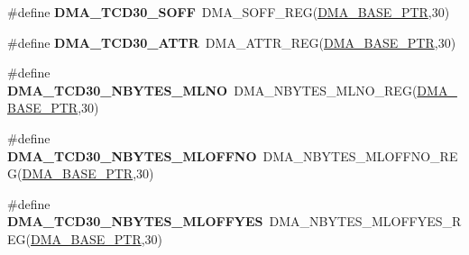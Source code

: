 \begin{DoxyCompactItemize}
\item 
\hypertarget{group___d_m_a___register___accessor___macros_ga91892f8ee9df2da70fd37dec9d07046d}{}\#define {\bfseries D\+M\+A\+\_\+\+T\+C\+D30\+\_\+\+S\+O\+F\+F}~D\+M\+A\+\_\+\+S\+O\+F\+F\+\_\+\+R\+E\+G(\hyperlink{group___d_m_a___peripheral_ga6997fbc1b1973e9f27170217a3bd6f22}{D\+M\+A\+\_\+\+B\+A\+S\+E\+\_\+\+P\+T\+R},30)\label{group___d_m_a___register___accessor___macros_ga91892f8ee9df2da70fd37dec9d07046d}

\item 
\hypertarget{group___d_m_a___register___accessor___macros_gabd8168bbcfdb00d4aa87d76fa96b08d7}{}\#define {\bfseries D\+M\+A\+\_\+\+T\+C\+D30\+\_\+\+A\+T\+T\+R}~D\+M\+A\+\_\+\+A\+T\+T\+R\+\_\+\+R\+E\+G(\hyperlink{group___d_m_a___peripheral_ga6997fbc1b1973e9f27170217a3bd6f22}{D\+M\+A\+\_\+\+B\+A\+S\+E\+\_\+\+P\+T\+R},30)\label{group___d_m_a___register___accessor___macros_gabd8168bbcfdb00d4aa87d76fa96b08d7}

\item 
\hypertarget{group___d_m_a___register___accessor___macros_ga3ecdb3c2d6e308785cd7825550565c0d}{}\#define {\bfseries D\+M\+A\+\_\+\+T\+C\+D30\+\_\+\+N\+B\+Y\+T\+E\+S\+\_\+\+M\+L\+N\+O}~D\+M\+A\+\_\+\+N\+B\+Y\+T\+E\+S\+\_\+\+M\+L\+N\+O\+\_\+\+R\+E\+G(\hyperlink{group___d_m_a___peripheral_ga6997fbc1b1973e9f27170217a3bd6f22}{D\+M\+A\+\_\+\+B\+A\+S\+E\+\_\+\+P\+T\+R},30)\label{group___d_m_a___register___accessor___macros_ga3ecdb3c2d6e308785cd7825550565c0d}

\item 
\hypertarget{group___d_m_a___register___accessor___macros_ga9ed8f27b577446997ab1b377e3980e2c}{}\#define {\bfseries D\+M\+A\+\_\+\+T\+C\+D30\+\_\+\+N\+B\+Y\+T\+E\+S\+\_\+\+M\+L\+O\+F\+F\+N\+O}~D\+M\+A\+\_\+\+N\+B\+Y\+T\+E\+S\+\_\+\+M\+L\+O\+F\+F\+N\+O\+\_\+\+R\+E\+G(\hyperlink{group___d_m_a___peripheral_ga6997fbc1b1973e9f27170217a3bd6f22}{D\+M\+A\+\_\+\+B\+A\+S\+E\+\_\+\+P\+T\+R},30)\label{group___d_m_a___register___accessor___macros_ga9ed8f27b577446997ab1b377e3980e2c}

\item 
\hypertarget{group___d_m_a___register___accessor___macros_gac0694764704c55721bd5fb8eb1c6ffba}{}\#define {\bfseries D\+M\+A\+\_\+\+T\+C\+D30\+\_\+\+N\+B\+Y\+T\+E\+S\+\_\+\+M\+L\+O\+F\+F\+Y\+E\+S}~D\+M\+A\+\_\+\+N\+B\+Y\+T\+E\+S\+\_\+\+M\+L\+O\+F\+F\+Y\+E\+S\+\_\+\+R\+E\+G(\hyperlink{group___d_m_a___peripheral_ga6997fbc1b1973e9f27170217a3bd6f22}{D\+M\+A\+\_\+\+B\+A\+S\+E\+\_\+\+P\+T\+R},30)\label{group___d_m_a___register___accessor___macros_gac0694764704c55721bd5fb8eb1c6ffba}


\end{DoxyCompactItemize}
